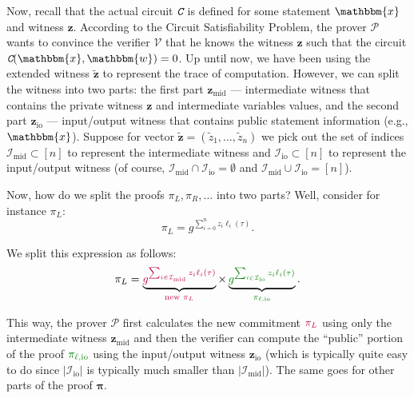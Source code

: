 \documentclass[../../book.tex]{subfiles}
\begin{document}
Now, recall that the actual circuit $\textit{\texttt{C}}$ is defined for some statement
$\mathbbm{x}$ and witness $\mathbf{z}$. According to the Circuit Satisfiability
Problem, the prover $\mathcal{P}$ wants to convince the verifier $\mathcal{V}$
that he knows the witness $\mathbf{z}$ such that the circuit $\Circ(\mathbbm{x},
\mathbbm{w}) = 0$. Up until now, we have been using the extended witness
$\widetilde{\mathbf{z}}$ to represent the trace of computation. However, we can
split the witness into two parts: the first part $\mathbf{z}_{\text{mid}}$ ---
intermediate witness that contains the private witness $\mathbf{z}$ and
intermediate variables values, and the second part $\mathbf{z}_{\text{io}}$ ---
input/output witness that contains public statement information (e.g.,
$\mathbbm{x}$). Suppose for vector $\widetilde{\mathbf{z}} =
(\widetilde{z}_1,\dots,\widetilde{z}_n)$ we pick out the set of indices
$\mathcal{I}_{\text{mid}} \subset [n]$ to represent the intermediate witness and
$\mathcal{I}_{\text{io}} \subset [n]$ to represent the input/output witness (of
course, $\mathcal{I}_{\text{mid}} \cap \mathcal{I}_{\text{io}} = \emptyset$ and
$\mathcal{I}_{\text{mid}} \cup \mathcal{I}_{\text{io}} = [n]$).

Now, how do we split the proofs $\pi_L,\pi_R,\dots$ into two parts? Well, consider for instance $\pi_L$:
\begin{equation*}
    \pi_L = g^{\sum_{i=0}^n z_i\ell_i(\tau)}.
\end{equation*}

We split this expression as follows:
\begin{equation*}
    \pi_L = \underbrace{\textcolor{purple}{g^{\sum_{i \in \mathcal{I}_{\text{mid}}} z_i\ell_i(\tau)}}}_{\textcolor{purple}{\text{new $\pi_L$}}} 
    \times 
    \underbrace{\textcolor{green!50!black}{g^{\sum_{i \in \mathcal{I}_{\text{io}}} z_i\ell_i(\tau)}}}_{\textcolor{green!50!black}{\pi_{\ell,\text{io}}}}.
\end{equation*}

This way, the prover $\mathcal{P}$ first calculates the new commitment $\textcolor{purple}{\pi_L}$ using 
only the intermediate witness $\mathbf{z}_{\text{mid}}$ and then 
the verifier can compute the ``public'' portion of the proof $\textcolor{green!50!black}{\pi_{\ell,\text{io}}}$ 
using the input/output witness $\mathbf{z}_{\text{io}}$ 
(which is typically quite easy to do since $|\mathcal{I}_{\text{io}}|$ is typically much smaller than 
$|\mathcal{I}_{\text{mid}}|$). The same goes for other parts of the proof $\boldsymbol{\pi}$.
\end{document}

